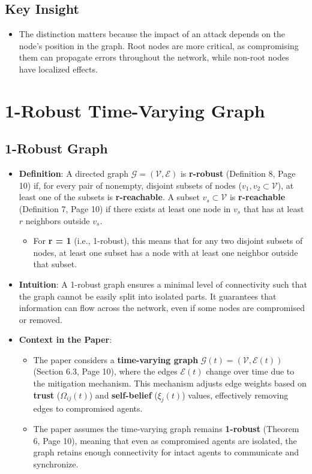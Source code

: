 \documentclass{article}
\begin{document}
\subsection{Key Insight}
\begin{itemize}
    \item The distinction matters because the impact of an attack depends on the node's position in the graph. Root nodes are more critical, as compromising them can propagate errors throughout the network, while non-root nodes have localized effects.
\end{itemize}

\section{1-Robust Time-Varying Graph}

\subsection{1-Robust Graph}
\begin{itemize}
    \item \textbf{Definition}: A directed graph $\mathcal{G} = (\mathcal{V}, \mathcal{E})$ is \textbf{r-robust} (Definition 8, Page 10) if, for every pair of nonempty, disjoint subsets of nodes ($v_1, v_2 \subset \mathcal{V}$), at least one of the subsets is \textbf{r-reachable}. A subset $v_s \subset \mathcal{V}$ is \textbf{r-reachable} (Definition 7, Page 10) if there exists at least one node in $v_s$ that has at least $r$ neighbors outside $v_s$.
    \begin{itemize}
        \item For \textbf{r = 1} (i.e., 1-robust), this means that for any two disjoint subsets of nodes, at least one subset has a node with at least one neighbor outside that subset.
    \end{itemize}
    
    \item \textbf{Intuition}: A 1-robust graph ensures a minimal level of connectivity such that the graph cannot be easily split into isolated parts. It guarantees that information can flow across the network, even if some nodes are compromised or removed.
    
    \item \textbf{Context in the Paper}:
    \begin{itemize}
        \item The paper considers a \textbf{time-varying graph} $\mathcal{G}(t) = (\mathcal{V}, \mathcal{E}(t))$ (Section 6.3, Page 10), where the edges $\mathcal{E}(t)$ change over time due to the mitigation mechanism. This mechanism adjusts edge weights based on \textbf{trust} ($\Omega_{ij}(t)$) and \textbf{self-belief} ($\xi_j(t)$) values, effectively removing edges to compromised agents.
        \item The paper assumes the time-varying graph remains \textbf{1-robust} (Theorem 6, Page 10), meaning that even as compromised agents are isolated, the graph retains enough connectivity for intact agents to communicate and synchronize.
    \end{itemize}
\end{itemize}
\end{document}
